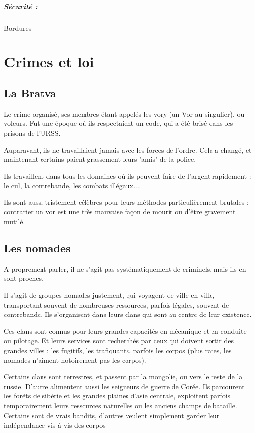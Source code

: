 \documentclass[10pt,a4paper]{book}
\begin{document}
\paragraph{Sécurité :}Bordures
\chapter{Crimes et loi}
\section{La Bratva}
Le crime organisé, ses membres étant appelés les vory (un Vor au singulier), ou voleurs. Fut une époque où ils respectaient un code, qui a été brisé dans les prisons de l'URSS. 

Auparavant, ils ne travaillaient jamais avec les forces de l'ordre. Cela a changé, et maintenant certains paient grassement leurs 'amis' de la police.

Ils travaillent dans tous les domaines où ils peuvent faire de l'argent rapidement : le cul, la contrebande, les combats illégaux.... 

Ils sont aussi tristement célèbres pour leurs méthodes particulièrement brutales : contrarier un vor est une très mauvaise façon de mourir ou d'être gravement mutilé.
\section{Les nomades}
A proprement parler, il ne s'agit pas systématiquement de criminels, mais ils en sont proches.

Il s'agit de groupes nomades justement, qui voyagent de ville en ville, transportant souvent de nombreuses ressources, parfois légales, souvent de contrebande. Ils s'organisent dans leurs clans qui sont au centre de leur existence.

Ces clans sont connus pour leurs grandes capacités en mécanique et en conduite ou pilotage. Et leurs services sont recherchés par ceux qui doivent sortir des grandes villes : les fugitifs, les trafiquants, parfois les corpos (plus rares, les nomades n'aiment notoirement pas les corpos). 

Certains clans sont terrestres, et passent par la mongolie, ou vers le reste de la russie. D'autre alimentent aussi les seigneurs de guerre de Corée. Ils parcourent les forêts de sibérie et les grandes plaines d'asie centrale, exploitent parfois temporairement leurs ressources naturelles ou les anciens champs de bataille. Certains sont de vrais bandits, d'autres veulent simplement garder leur indépendance vis-à-vis des corpos
\end{document}

